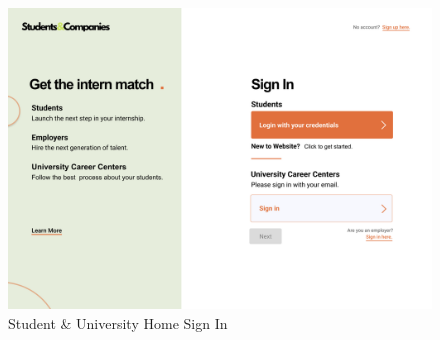 \documentclass{article}
\begin{document}
\begin{figure}[H]
    \centering
    \includegraphics[scale = 0.40]{figures/UserInterfaces/General/HomeSignIn.png}
    \caption{Student \& University Home Sign In}
     \centering
\end{figure}
\end{document}

